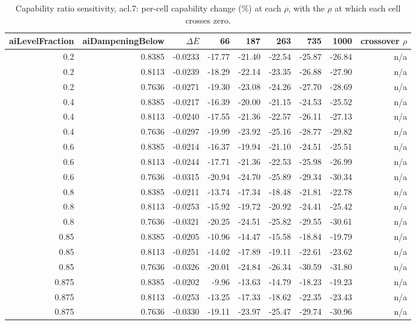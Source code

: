 \begin{table}[htbp]
  \centering
  \caption{Capability ratio sensitivity, acl.7: per-cell capability change (\%) at each $\rho$, with the $\rho$ at which each cell crosses zero.}
  \label{tab:rho-acl-7-cells}
  \begin{tabular}{r r r r r r r r r}
    \toprule
    aiLevelFraction & aiDampeningBelow & $\Delta\overline{E}$ & 66 & 187 & 263 & 735 & 1000 & crossover $\rho$ \\
    \midrule
    0.2 & 0.8385 & -0.0233 & -17.77 & -21.40 & -22.54 & -25.87 & -26.84 & n/a \\
    0.2 & 0.8113 & -0.0239 & -18.29 & -22.14 & -23.35 & -26.88 & -27.90 & n/a \\
    0.2 & 0.7636 & -0.0271 & -19.30 & -23.08 & -24.26 & -27.70 & -28.69 & n/a \\
    0.4 & 0.8385 & -0.0217 & -16.39 & -20.00 & -21.15 & -24.53 & -25.52 & n/a \\
    0.4 & 0.8113 & -0.0240 & -17.55 & -21.36 & -22.57 & -26.11 & -27.13 & n/a \\
    0.4 & 0.7636 & -0.0297 & -19.99 & -23.92 & -25.16 & -28.77 & -29.82 & n/a \\
    0.6 & 0.8385 & -0.0214 & -16.37 & -19.94 & -21.10 & -24.51 & -25.51 & n/a \\
    0.6 & 0.8113 & -0.0244 & -17.71 & -21.36 & -22.53 & -25.98 & -26.99 & n/a \\
    0.6 & 0.7636 & -0.0315 & -20.94 & -24.70 & -25.89 & -29.34 & -30.34 & n/a \\
    0.8 & 0.8385 & -0.0211 & -13.74 & -17.34 & -18.48 & -21.81 & -22.78 & n/a \\
    0.8 & 0.8113 & -0.0253 & -15.92 & -19.72 & -20.92 & -24.41 & -25.42 & n/a \\
    0.8 & 0.7636 & -0.0321 & -20.25 & -24.51 & -25.82 & -29.55 & -30.61 & n/a \\
    0.85 & 0.8385 & -0.0205 & -10.96 & -14.47 & -15.58 & -18.84 & -19.79 & n/a \\
    0.85 & 0.8113 & -0.0251 & -14.02 & -17.89 & -19.11 & -22.61 & -23.62 & n/a \\
    0.85 & 0.7636 & -0.0326 & -20.01 & -24.84 & -26.34 & -30.59 & -31.80 & n/a \\
    0.875 & 0.8385 & -0.0202 & -9.96 & -13.63 & -14.79 & -18.23 & -19.23 & n/a \\
    0.875 & 0.8113 & -0.0253 & -13.25 & -17.33 & -18.62 & -22.35 & -23.43 & n/a \\
    0.875 & 0.7636 & -0.0330 & -19.11 & -23.97 & -25.47 & -29.74 & -30.96 & n/a \\
    \bottomrule
  \end{tabular}
\end{table}
